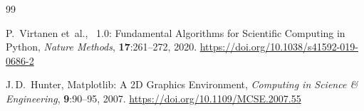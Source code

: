 ﻿\documentclass[a4paper,12pt]{article}
\theoremstyle{definition}
\begin{document}
\begin{thebibliography}{99}
		
		P.~Virtanen et~al.,
		~1.0: Fundamental Algorithms for Scientific Computing in
		{Python},
		\newblock \emph{Nature Methods}, \textbf{17}:261--272, 2020.
		\newblock \url{https://doi.org/10.1038/s41592-019-0686-2}
		
		J.\,D.~Hunter,
		\newblock Matplotlib: A {2D} Graphics Environment,
		\newblock \emph{Computing in Science \& Engineering}, \textbf{9}:90--95, 2007.
		\newblock \url{https://doi.org/10.1109/MCSE.2007.55}
		
	\end{thebibliography}	
\end{document}
